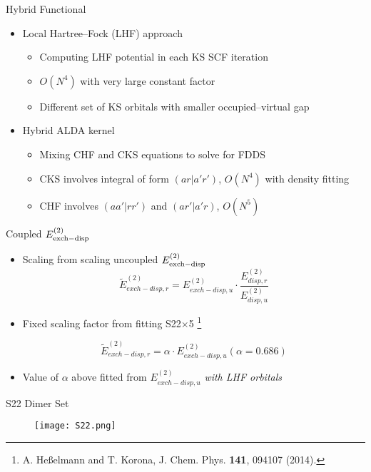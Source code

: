 \documentclass{beamer}
\newcommand\blfootnote[1]{%
  \begingroup
  \renewcommand\thefootnote{}\footnote{#1}%
  \addtocounter{footnote}{-1}%
  \endgroup
}
\begin{document}
    \begin{frame}{Hybrid Functional}
        \begin{itemize} 
            \item Local Hartree--Fock (LHF) approach  
            \begin{itemize}
                \item Computing LHF potential in each KS SCF iteration
                \item $O(N^4)$ with very large constant factor
                \item Different set of KS orbitals with smaller occupied--virtual gap
            \end{itemize}
            \item Hybrid ALDA kernel
            \begin{itemize}
                \item Mixing CHF and CKS equations to solve for FDDS
                \item CKS involves integral of form $(ar|a'r')$, $O(N^4)$ with density fitting
                \item CHF involves $(aa'|rr')$ and $(ar'|a'r)$, $O(N^5)$
            \end{itemize}
        \end{itemize} 
    \end{frame}
        
    \begin{frame}{Coupled $E_{\rm{exch-disp}}^{(2)}$}
        \begin{itemize}
            \item Scaling from scaling uncoupled $E_{\rm{exch-disp}}^{(2)}$
            $$\tilde{E}^{(2)}_{exch-disp,r} = E^{(2)}_{exch-disp,u} \cdot \frac{E^{(2)}_{disp,r}}{E^{(2)}_{disp,u}}$$
            \item Fixed scaling factor from fitting S22$\times$5\blfootnote{A. He{\ss}elmann and T. Korona, J. Chem. Phys. \textbf{141}, 094107 (2014).}
            $$\tilde{E}^{(2)}_{exch-disp,r} = \alpha \cdot E^{(2)}_{exch-disp,u} (\alpha = 0.686)$$
            \item Value of $\alpha$ above fitted from $E_{exch-disp,u}^{(2)}$ \textit{with LHF orbitals}
        \end{itemize}
    \end{frame}

    \begin{frame}{S22 Dimer Set}
        \begin{figure}
            \centering
            \texttt{[image: S22.png]}
        \end{figure}
    \end{frame}
\end{document}

